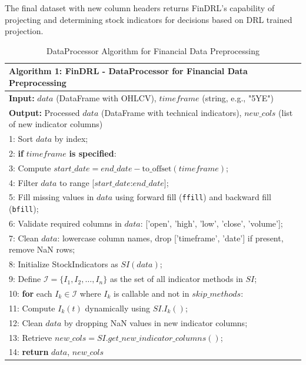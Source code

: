 


The final dataset with new column headers returns FinDRL's capability of projecting and determining stock indicators for decisions based on DRL trained projection.


\begin{table}[h]
\small
\centering
\begin{tabular}{|p{16cm}|}
\hline
\textbf{Algorithm 1: FinDRL - DataProcessor for Financial Data Preprocessing} \\
\hline
\textbf{Input:} $data$ (DataFrame with OHLCV), $timeframe$ (string, e.g., "5YE") \\
\textbf{Output:} Processed $data$ (DataFrame with technical indicators), $new\_cols$ (list of new indicator columns) \\
\hline
1: Sort $data$ by index; \\
2: \textbf{if} $timeframe$ \textbf{is specified}: \\
3: \quad Compute $start\_date = end\_date - \text{to\_offset}(timeframe)$; \\
4: \quad Filter $data$ to range [$start\_date$:$end\_date$]; \\
5: Fill missing values in $data$ using forward fill (\texttt{ffill}) and backward fill (\texttt{bfill}); \\
6: Validate required columns in $data$: ['open', 'high', 'low', 'close', 'volume']; \\
7: Clean $data$: lowercase column names, drop ['timeframe', 'date'] if present, remove NaN rows; \\
8: Initialize StockIndicators as $SI(data)$; \\
9: Define $\mathcal{I} = \{I_1, I_2, \ldots, I_n\}$ as the set of all indicator methods in $SI$; \\
10: \textbf{for} each $I_k \in \mathcal{I}$ where $I_k$ is callable and not in $skip\_methods$: \\
11: \quad Compute $I_k(t)$ dynamically using $SI.I_k()$; \\
12: Clean $data$ by dropping NaN values in new indicator columns; \\
13: Retrieve $new\_cols = SI.get\_new\_indicator\_columns()$; \\
14: \textbf{return} $data$, $new\_cols$ \\
\hline
\end{tabular}
\caption{DataProcessor Algorithm for Financial Data Preprocessing}
\label{tab:findrl_dataprocessor_algorithm}
\end{table}

